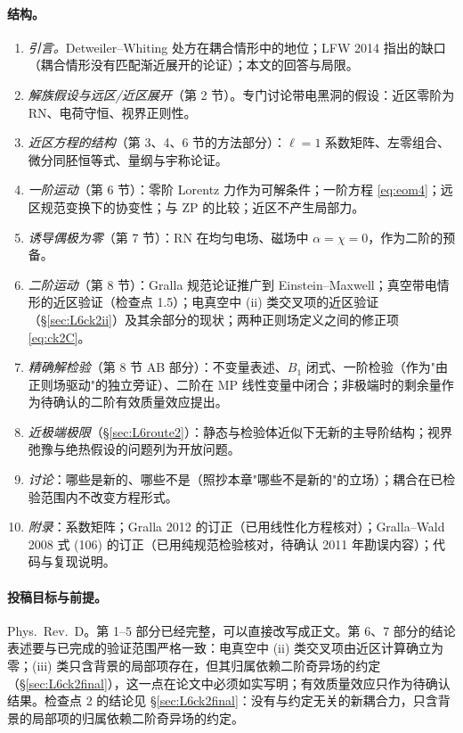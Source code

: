 \documentclass[11pt,a4paper]{ctexart}
\numberwithin{equation}{section}
\begin{document}
\paragraph{结构。}
\begin{enumerate}
\item \emph{引言。}Detweiler--Whiting 处方在耦合情形中的地位；LFW 2014 指出的缺口（耦合情形没有匹配渐近展开的论证）；本文的回答与局限。
\item \emph{解族假设与远区/近区展开}（第 2 节）。专门讨论带电黑洞的假设：近区零阶为 RN、电荷守恒、视界正则性。
\item \emph{近区方程的结构}（第 3、4、6 节的方法部分）：$\ell=1$ 系数矩阵、左零组合、微分同胚恒等式、量纲与宇称论证。
\item \emph{一阶运动}（第 6 节）：零阶 Lorentz 力作为可解条件；一阶方程 \eqref{eq:eom4}；远区规范变换下的协变性；与 ZP 的比较；近区不产生局部力。
\item \emph{诱导偶极为零}（第 7 节）：RN 在均匀电场、磁场中 $\alpha=\chi=0$，作为二阶的预备。
\item \emph{二阶运动}（第 8 节）：Gralla 规范论证推广到 Einstein--Maxwell；真空带电情形的近区验证（检查点 1.5）；电真空中 (ii) 类交叉项的近区验证（\S\ref{sec:L6ck2ii}）及其余部分的现状；两种正则场定义之间的修正项 \eqref{eq:ck2C}。
\item \emph{精确解检验}（第 8 节 AB 部分）：不变量表述、$B_1$ 闭式、一阶检验（作为"由正则场驱动"的独立旁证）、二阶在 MP 线性变量中闭合；非极端时的剩余量作为待确认的二阶有效质量效应提出。
\item \emph{近极端极限}（\S\ref{sec:L6route2}）：静态与检验体近似下无新的主导阶结构；视界弛豫与绝热假设的问题列为开放问题。
\item \emph{讨论}：哪些是新的、哪些不是（照抄本章"哪些不是新的"的立场）；耦合在已检验范围内不改变方程形式。
\item \emph{附录}：系数矩阵；Gralla 2012 的订正（已用线性化方程核对）；Gralla--Wald 2008 式 (106) 的订正（已用纯规范检验核对，待确认 2011 年勘误内容）；代码与复现说明。
\end{enumerate}

\paragraph{投稿目标与前提。}Phys.\ Rev.\ D。第 1--5 部分已经完整，可以直接改写成正文。第 6、7 部分的结论表述要与已完成的验证范围严格一致：电真空中 (ii) 类交叉项由近区计算确立为零；(iii) 类只含背景的局部项存在，但其归属依赖二阶奇异场的约定（\S\ref{sec:L6ck2final}），这一点在论文中必须如实写明；有效质量效应只作为待确认结果。检查点 2 的结论见 \S\ref{sec:L6ck2final}：没有与约定无关的新耦合力，只含背景的局部项的归属依赖二阶奇异场的约定。
\end{document}

